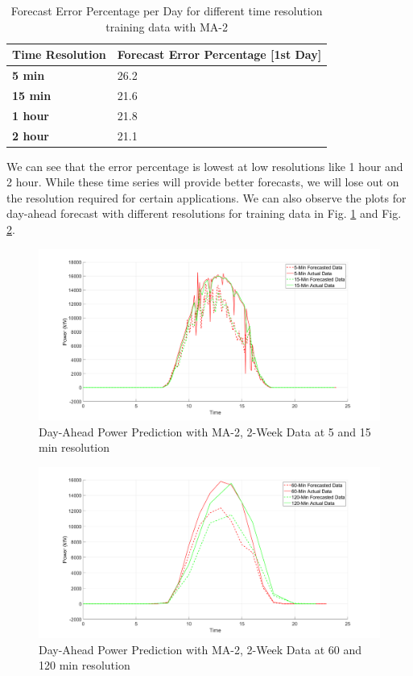 \documentclass[journal]{IEEEtran}
\begin{document}
\begin{table}[htpb]
  \centering
  \caption{Forecast Error Percentage per Day for different time resolution training data with MA-2}
\begin{tabular}{|l|l|}
\hline
\textbf{Time Resolution} & \textbf{Forecast Error Percentage {[}1st Day{]}} \\ \hline
\textbf{5 min} & 26.2 \\ \hline
\textbf{15 min} & 21.6 \\ \hline
\textbf{1 hour} & 21.8 \\ \hline
\textbf{2 hour} & 21.1 \\ \hline
\end{tabular}
\label{tab6}
\end{table}

We can see that the error percentage is lowest at low resolutions like 1 hour and 2 hour. While these time series will provide better forecasts, we will lose out on the resolution required for certain applications. We can also observe the plots for day-ahead forecast with different resolutions for training data in Fig. \ref{fig14} and Fig. \ref{fig15}.

\begin{figure}[htpb]
	\centering
	\includegraphics[scale=0.2]{DiffTimeResolution_5_15_Min.png}
	\caption{Day-Ahead Power Prediction with MA-2, 2-Week Data at 5 and 15 min resolution}
	\label{fig14} %
\end{figure}

\begin{figure}[htpb]
	\centering
	\includegraphics[scale=0.2]{DiffTimeResolution_60_120_Min.png}
	\caption{Day-Ahead Power Prediction with MA-2, 2-Week Data at 60 and 120 min resolution}
	\label{fig15} %
\end{figure}
\end{document}
